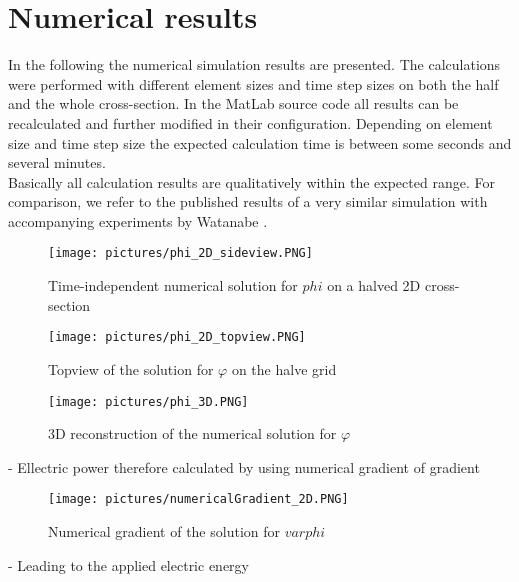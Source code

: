 \documentclass[parskip=half, titlepage=yes, 12pt, BCOR=12mm, DIV=calc]{scrartcl}
\begin{document}
\section{Numerical results}

In the following the numerical simulation results are presented. The calculations were performed with different element sizes and time step sizes on both the half and the whole cross-section. In the MatLab source code all results can be recalculated and further modified in their configuration. Depending on element size and time step size the expected calculation time is between some seconds and several minutes. \\

Basically all calculation results are qualitatively within the expected range. For comparison, we refer to the published results of a very similar simulation with accompanying experiments by Watanabe \cite{watanabe}.

\begin{figure}[H]
    \centering
        \texttt{[image: pictures/phi\_2D\_sideview.PNG]}
        \caption{Time-independent numerical solution for $phi$ on a halved 2D cross-section}
        \label{phi_2D_sideview}
\end{figure}


\begin{figure}[H]
    \centering
        \texttt{[image: pictures/phi\_2D\_topview.PNG]}
        \caption{Topview of the solution for $\varphi$ on the halve grid}
        \label{phi_2D_topview}
\end{figure}



\begin{figure}[H]
    \centering
    \texttt{[image: pictures/phi\_3D.PNG]}
    \caption{3D reconstruction of the numerical solution for $\varphi$}
    \label{phi_3D}
\end{figure}


- Ellectric power therefore calculated by using numerical gradient of  gradient  

\begin{figure}[H]
    \centering
    \texttt{[image: pictures/numericalGradient\_2D.PNG]}
    \caption{Numerical gradient of the solution for $varphi$}
    \label{numericalGradient_2D}
\end{figure}

- Leading to the applied electric energy  
\end{document}
